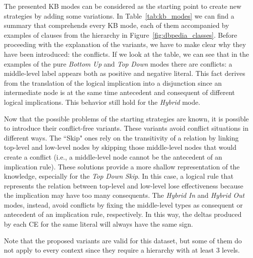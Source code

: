 The presented KB modes can be considered as the starting point to create new strategies by adding some variations. In Table~\ref{tab:kb_modes} we can find a summary that comprehends every KB mode, each of them accompanied by examples of clauses from the hierarchy in Figure~\ref{fig:dbpedia_classes}. Before proceeding with the explanation of the variants, we have to make clear why they have been introduced: the conflicts. If we look at the table, we can see that in the examples of the pure \textit{Bottom Up} and \textit{Top Down} modes there are conflicts: a middle-level label appears both as positive and negative literal. This fact derives from the translation of the logical implication into a disjunction since an intermediate node is at the same time antecedent and consequent of different logical implications. This behavior still hold for the \textit{Hybrid} mode.

Now that the possible problems of the starting strategies are known, it is possible to introduce their conflict-free variants. These variants avoid conflict situations in different ways. The ``Skip" ones rely on the transitivity of a relation by linking top-level and low-level nodes by skipping those middle-level nodes that would create a conflict (i.e., a middle-level node cannot be the antecedent of an implication rule). These solutions provide a more shallow representation of the knowledge, especially for the \textit{Top Down Skip}. In this case, a logical rule that represents the relation between top-level and low-level lose effectiveness because the implication may have too many consequents. The \textit{Hybrid In} and \textit{Hybrid Out} modes, instead, avoid conflicts by fixing the middle-level types as consequent or antecedent of an implication rule, respectively. In this way, the deltas produced by each CE for the same literal will always have the same sign.

Note that the proposed variants are valid for this dataset, but some of them do not apply to every context since they require a hierarchy with at least 3 levels.

